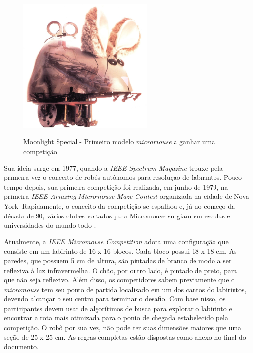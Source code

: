 \begin{figure}[H]
	\centering
	\caption{Moonlight Special - Primeiro modelo \textit{micromouse} a ganhar uma competição.}
	\includegraphics[width=0.6\textwidth]
	{Figures/MoonlightSpecial.jpg}
	\label{fig:MoonlightSpecial}
	\newline
\end{figure}

\hspace{0.5cm} Sua ideia surge em 1977, quando a \textit{IEEE Spectrum Magazine} trouxe pela primeira vez o conceito de robôs autônomos para resolução de labirintos. Pouco tempo depois, sua primeira competição foi realizada, em junho de 1979, na primeira \textit{IEEE Amazing Micromouse Maze Contest} organizada na cidade de Nova York. Rapidamente, o conceito da competição se espalhou e, já no começo da década de 90, vários clubes voltados para Micromouse surgiam em escolas e universidades do mundo todo \cite{Tondr2004}.

\hspace{0.5cm} Atualmente, a \textit{IEEE Micromouse Competition} adota uma configuração que consiste em um labirinto de 16 x 16 blocos. Cada bloco possui 18 x 18 cm. As paredes, que possuem 5 cm de altura, são pintadas de branco de modo a ser reflexiva à luz infravermelha. O chão, por outro lado, é pintado de preto, para que não seja reflexivo. Além disso, os competidores sabem previamente que o \textit{micromouse} tem seu ponto de partida localizado em um dos cantos do labirintos, devendo alcançar o seu centro para terminar o desafio. Com base nisso, os participantes devem usar de algorítimos de busca para explorar o labirinto e encontrar a rota mais otimizada para o ponto de chegada estabelecido pela competição. O robô por sua vez, não pode ter suas dimensões maiores que uma seção de 25 x 25 cm. As regras completas estão dispostas como anexo no final do documento.

